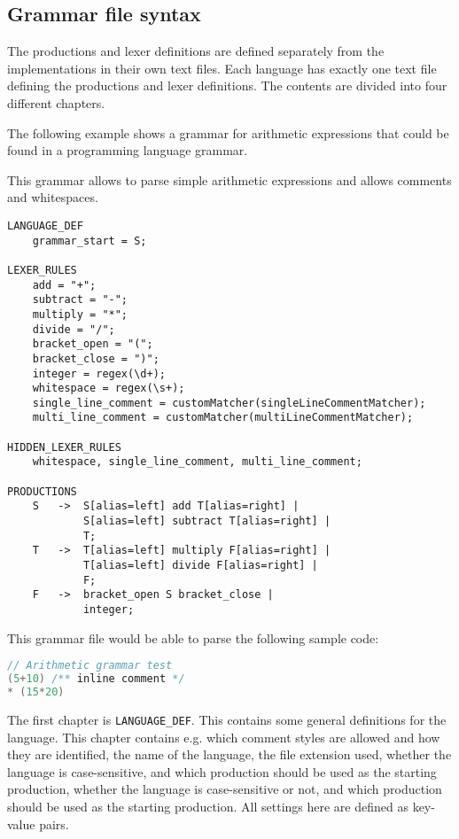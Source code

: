 \subsection{Grammar file syntax}
The productions and lexer definitions are defined separately from the implementations in their own text files. 
Each language has exactly one text file defining the productions and lexer definitions. The contents are divided into four different chapters.

The following example shows a grammar for arithmetic expressions that could be found in a programming language grammar.

This grammar allows to parse simple arithmetic expressions and allows comments and whitespaces.

\begin{lstlisting}[caption=Grammar file example]
LANGUAGE_DEF
    grammar_start = S;

LEXER_RULES
    add = "+";
    subtract = "-";
    multiply = "*";
    divide = "/";
    bracket_open = "(";
    bracket_close = ")";
    integer = regex(\d+);
    whitespace = regex(\s+);
    single_line_comment = customMatcher(singleLineCommentMatcher);
    multi_line_comment = customMatcher(multiLineCommentMatcher);

HIDDEN_LEXER_RULES
    whitespace, single_line_comment, multi_line_comment;

PRODUCTIONS
    S   ->  S[alias=left] add T[alias=right] | 
            S[alias=left] subtract T[alias=right] | 
            T;
    T   ->  T[alias=left] multiply F[alias=right] | 
            T[alias=left] divide F[alias=right] | 
            F;
    F   ->  bracket_open S bracket_close | 
            integer;
\end{lstlisting}

This grammar file would be able to parse the following sample code:

\begin{lstlisting}[language=Java, caption=Grammar file example]
// Arithmetic grammar test
(5+10) /** inline comment */ 
* (15*20)
\end{lstlisting}

The first chapter is \verb|LANGUAGE_DEF|. This contains some general definitions for the language. 
This chapter contains e.g. which comment styles are allowed and how they are identified, the name of the language, the file extension used, whether the language is case-sensitive, and which production should be used as the starting production, 
whether the language is case-sensitive or not, and which production should be used as the starting production. 
All settings here are defined as key-value pairs.

